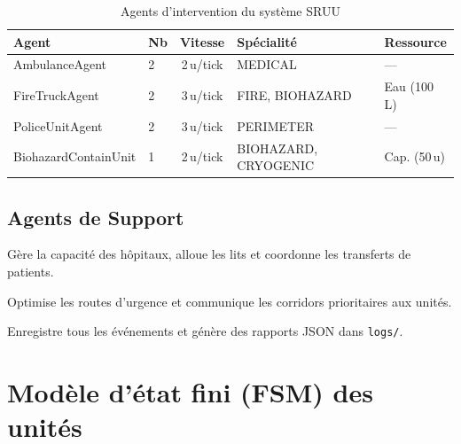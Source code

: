 \documentclass[12pt, a4paper]{report}
\begin{document}
\begin{table}[H]
\centering
\caption{Agents d'intervention du système SRUU}
\begin{tabularx}{\textwidth}{llcXl}
\toprule
\rowcolor{NavyCard!15}
\color{CyanNeon}Agent & \color{CyanNeon}Nb & \color{CyanNeon}Vitesse
  & \color{CyanNeon}Spécialité & \color{CyanNeon}Ressource \\
\midrule
AmbulanceAgent          & 2 & 2\,u/tick & MEDICAL              & --- \\
FireTruckAgent          & 2 & 3\,u/tick & FIRE, BIOHAZARD      & Eau (100\,L) \\
PoliceUnitAgent         & 2 & 3\,u/tick & PERIMETER            & --- \\
BiohazardContainUnit    & 1 & 2\,u/tick & BIOHAZARD, CRYOGENIC & Cap. (50\,u) \\
\bottomrule
\end{tabularx}
\end{table}

\subsection{Agents de Support}

\begin{description}[leftmargin=2cm, style=nextline, itemsep=4pt]
  \item[\color{GreenNeon}MedicalCoordinatorAgent]
    Gère la capacité des hôpitaux, alloue les lits et coordonne les transferts de patients.

  \item[\color{OrangeNeon}TrafficControllerAgent]
    Optimise les routes d'urgence et communique les corridors prioritaires aux unités.

  \item[\color{PurpleNeon}LoggerAgent]
    Enregistre tous les événements et génère des rapports JSON dans \texttt{logs/}.
\end{description}

\section{Modèle d'état fini (FSM) des unités}
\end{document}
